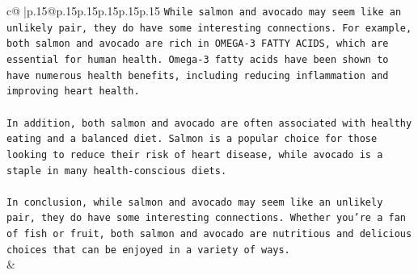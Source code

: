 \documentclass{article}
\begin{document}
{\begin{supertabular}{c@{$\;$}|p{.15\linewidth}@{}p{.15\linewidth}p{.15\linewidth}p{.15\linewidth}p{.15\linewidth}p{.15\linewidth}}
{{{\texttt{While salmon and avocado may seem like an unlikely pair, they do have some interesting connections. For example, both salmon and avocado are rich in OMEGA{-}3 FATTY ACIDS, which are essential for human health. Omega{-}3 fatty acids have been shown to have numerous health benefits, including reducing inflammation and improving heart health.} \\
\\ 
\texttt{In addition, both salmon and avocado are often associated with healthy eating and a balanced diet. Salmon is a popular choice for those looking to reduce their risk of heart disease, while avocado is a staple in many health{-}conscious diets.} \\
\\ 
\texttt{In conclusion, while salmon and avocado may seem like an unlikely pair, they do have some interesting connections. Whether you're a fan of fish or fruit, both salmon and avocado are nutritious and delicious choices that can be enjoyed in a variety of ways.} \\
            }
        }
    }
    & \\ \\


\end{supertabular}}
\end{document}
